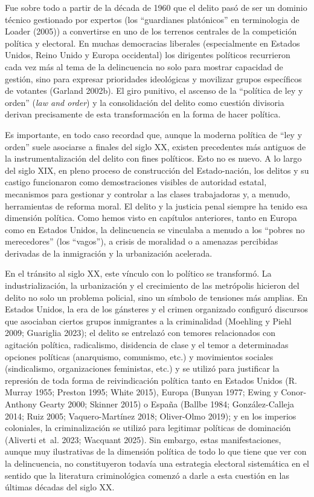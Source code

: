 \documentclass[
  spanish,
  letterpaper,
  DIV=11,
  numbers=noendperiod]{scrreprt}
\begin{document}
Fue sobre todo a partir de la década de 1960 que el delito pasó de ser
un dominio técnico gestionado por expertos (los ``guardianes
platónicos'' en terminologia de Loader (2005)) a convertirse en uno de
los terrenos centrales de la competición política y electoral. En muchas
democracias liberales (especialmente en Estados Unidos, Reino Unido y
Europa occidental) los dirigentes políticos recurrieron cada vez más al
tema de la delincuencia no solo para mostrar capacidad de gestión, sino
para expresar prioridades ideológicas y movilizar grupos específicos de
votantes (Garland 2002b). El giro punitivo, el ascenso de la ``política
de ley y orden'' (\emph{law and order}) y la consolidación del delito
como cuestión divisoria derivan precisamente de esta transformación en
la forma de hacer política.

Es importante, en todo caso recordad que, aunque la moderna política de
``ley y orden'' suele asociarse a finales del siglo XX, existen
precedentes más antiguos de la instrumentalización del delito con fines
políticos. Esto no es nuevo. A lo largo del siglo XIX, en pleno proceso
de construcción del Estado-nación, los delitos y su castigo funcionaron
como demostraciones visibles de autoridad estatal, mecanismos para
gestionar y controlar a las clases trabajadoras y, a menudo,
herramientas de reforma moral. El delito y la justicia penal siempre ha
tenido esa dimensión política. Como hemos visto en capítulos anteriores,
tanto en Europa como en Estados Unidos, la delincuencia se vinculaba a
menudo a los ``pobres no merecedores'' (los ``vagos''), a crisis de
moralidad o a amenazas percibidas derivadas de la inmigración y la
urbanización acelerada.

En el tránsito al siglo XX, este vínculo con lo político se transformó.
La industrialización, la urbanización y el crecimiento de las metrópolis
hicieron del delito no solo un problema policial, sino un símbolo de
tensiones más amplias. En Estados Unidos, la era de los gánsteres y el
crimen organizado configuró discursos que asociaban ciertos grupos
inmigrantes a la criminalidad (Moehling y Piehl 2009; Guariglia 2023);
el delito se entrelazó con temores relacionados con agitación política,
radicalismo, disidencia de clase y el temor a determinadas opciones
políticas (anarquismo, comunismo, etc.) y movimientos sociales
(sindicalismo, organizaciones feministas, etc.) y se utilizó para
justificar la represión de toda forma de reivindicación política tanto
en Estados Unidos (R. Murray 1955; Preston 1995; White 2015), Europa
(Bunyan 1977; Ewing y Conor-Anthony Gearty 2000; Skinner 2015) o España
(Ballbe 1984; González-Calleja 2014; Ruiz 2005; Vaquero-Martínez 2018;
Oliver-Olmo 2019); y en los imperios coloniales, la criminalización se
utilizó para legitimar políticas de dominación (Aliverti et~al. 2023;
Wacquant 2025). Sin embargo, estas manifestaciones, aunque muy
ilustrativas de la dimensión política de todo lo que tiene que ver con
la delincuencia, no constituyeron todavía una estrategia electoral
sistemática en el sentido que la literatura criminológica comenzó a
darle a esta cuestión en las últimas décadas del siglo XX.
\end{document}
